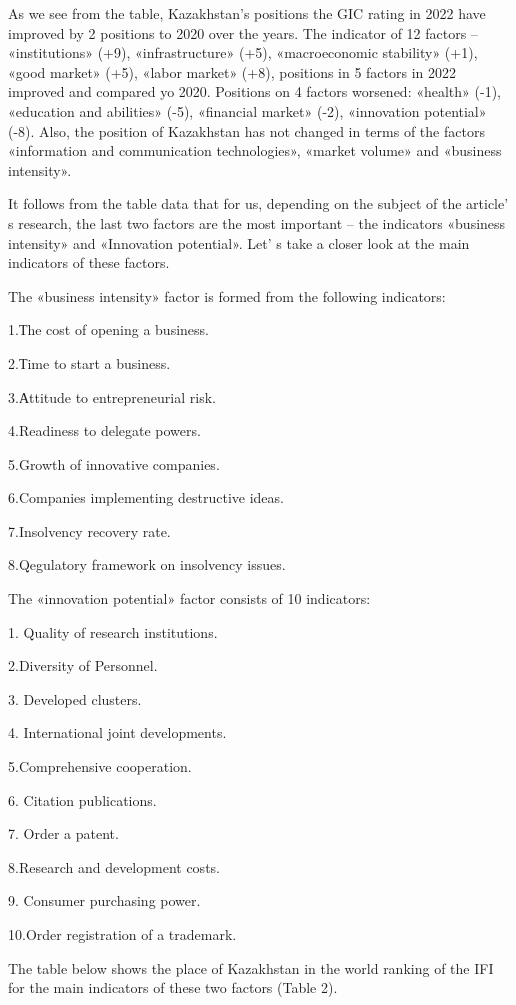 {{As we see from the table, Kazakhstan's positions the GIC rating in 2022
have improved by 2 positions to 2020 over the years. The indicator of 12
factors -- «institutions» (+9), «infrastructure» (+5), «macroeconomic
stability» (+1), «good market» (+5), «labor market» (+8), positions in 5
factors in 2022 improved and compared yo 2020. Positions on 4 factors
worsened: «health» (-1), «education and abilities» (-5), «financial
market» (-2), «innovation potential» (-8). Also, the position of
Kazakhstan has not changed in terms of the factors «information and
communication technologies», «market volume» and «business intensity».

It follows from the table data that for us, depending on the subject of
the article' s research, the last two factors are the
most important -- the indicators «business intensity» and «Innovation
potential». Let' s take a closer look at the main
indicators of these factors.

The «business intensity» factor is formed from the following indicators:

1.Тhe cost of opening a business.

2.Тime to start a business.

3.Аttitude to entrepreneurial risk.

4.Readiness to delegate powers.

5.Growth of innovative companies.

6.Companies implementing destructive ideas.

7.Insolvency recovery rate.

8.Qegulatory framework on insolvency issues.

The «innovation potential» factor consists of 10 indicators:

1. Quality of research institutions.

2.Diversity of Personnel.

3. Developed clusters.

4. International joint developments.

5.Comprehensive cooperation.

6. Citation publications.

7. Order a patent.

8.Research and development costs.

9. Consumer purchasing power.

10.Order registration of a trademark.

The table below shows the place of Kazakhstan in the world ranking of
the IFI for the main indicators of these two factors (Table 2).

}}
